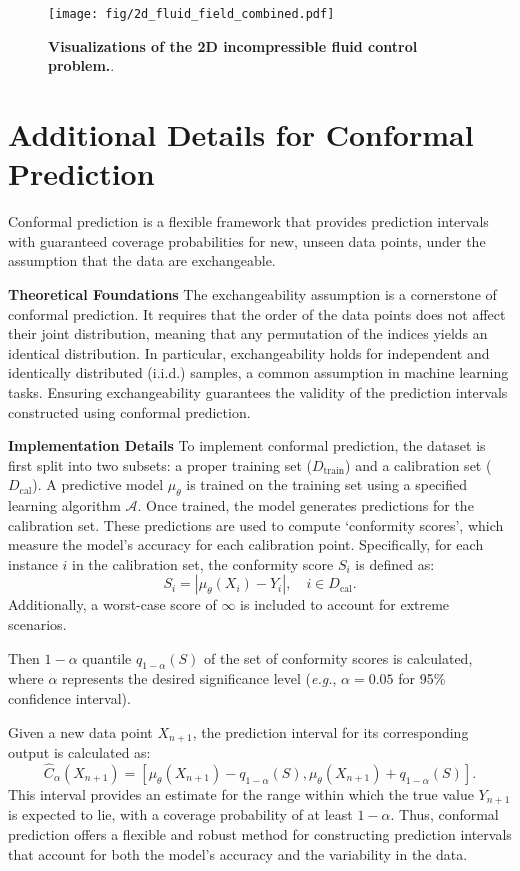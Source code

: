 \begin{figure}[H]
\begin{center}
    \texttt{[image: fig/2d\_fluid\_field\_combined.pdf]}
\end{center}
\caption{\textbf{Visualizations of the 2D incompressible fluid control problem.}.}
\label{fig:2d_add}
\end{figure}


\section{Additional Details for Conformal Prediction}
\label{app:cp}
Conformal prediction is a flexible framework that provides prediction intervals with guaranteed coverage probabilities for new, unseen data points, under the assumption that the data are exchangeable.

\textbf{Theoretical Foundations} The exchangeability assumption is a cornerstone of conformal prediction. It requires that the order of the data points does not affect their joint distribution, meaning that any permutation of the indices yields an identical distribution. In particular, exchangeability holds for independent and identically distributed (i.i.d.) samples, a common assumption in machine learning tasks. Ensuring exchangeability guarantees the validity of the prediction intervals constructed using conformal prediction.

\textbf{Implementation Details} To implement conformal prediction, the dataset is first split into two subsets: a proper training set ($D_\text{train}$) and a calibration set ($D_\text{cal}$). A predictive model \({\mu}_\theta\) is trained on the training set using a specified learning algorithm \(\mathcal{A}\). Once trained, the model generates predictions for the calibration set. These predictions are used to compute `conformity scores', which measure the model's accuracy for each calibration point. Specifically, for each instance \(i\) in the calibration set, the conformity score \(S_i\) is defined as:
   \[
   S_i = |{\mu}_\theta(X_i) - Y_i|, \quad i \in D_\text{cal}.
   \]
Additionally, a worst-case score of \(\infty\) is included to account for extreme scenarios. 

Then \(1 - \alpha\) quantile \(q_{1-\alpha}(S)\) of the set of conformity scores is calculated, where \(\alpha\) represents the desired significance level (\emph{e.g.}, $\alpha=0.05$ for 95\% confidence interval).

Given a new data point \(X_{n+1}\), the prediction interval for its corresponding output is calculated as:
   \[
   \hat{C}_\alpha(X_{n+1}) = \left[{\mu}_\theta(X_{n+1}) - q_{1-\alpha}(S), {\mu}_\theta(X_{n+1}) + q_{1-\alpha}(S)\right].
   \]
This interval provides an estimate for the range within which the true value \(Y_{n+1}\) is expected to lie, with a coverage probability of at least \(1 - \alpha\). Thus, conformal prediction offers a flexible and robust method for constructing prediction intervals that account for both the model’s accuracy and the variability in the data.

